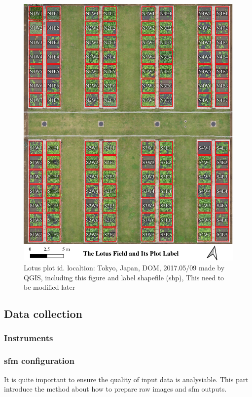 \documentclass[sensors,article,submit,moreauthors, xelatex]{Definitions/mdpi}
\begin{document}
\begin{figure}[H]
\centering
\includegraphics[width=0.95\linewidth]{figures/plot_with_id.pdf}
\caption{Lotus plot id. localtion: Tokyo, Japan, DOM, 2017.05/09 made by QGIS, including this figure and label shapefile (shp), This need to be modified later}
\label{fig:plotid}
\end{figure}

\subsection{Data collection}
\subsubsection{Instruments}

\subsubsection{\acrshort*{sfm} configuration}
It is quite important to ensure the quality of input data is analysiable. This part introduce the method about how to prepare raw images and \acrshort*{sfm} outputs. 
\end{document}
